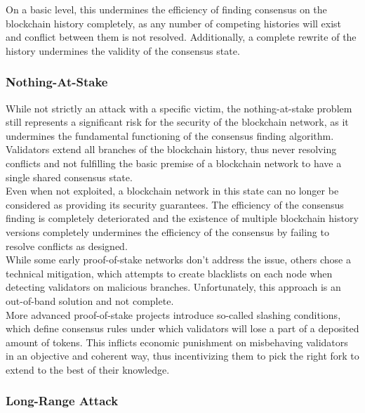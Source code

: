\documentclass[12pt,a4paper]{article}
\begin{document}
On a basic level, this undermines the efficiency of finding consensus on the blockchain history completely, as any number of competing histories will exist and conflict between them is not resolved. Additionally, a complete rewrite of the history undermines the validity of the consensus state.\\

\subsubsection{Nothing-At-Stake}

While not strictly an attack with a specific victim, the nothing-at-stake problem still represents a significant risk for the security of the blockchain network, as it undermines the fundamental functioning of the consensus finding algorithm. Validators extend all branches of the blockchain history, thus never resolving conflicts and not fulfilling the basic premise of a blockchain network to have a single shared consensus state.\\

Even when not exploited, a blockchain network in this state can no longer be considered as providing its security guarantees. The efficiency of the consensus finding is completely deteriorated and the existence of multiple blockchain history versions completely undermines the efficiency of the consensus by failing to resolve conflicts as designed.\\

While some early proof-of-stake networks don't address the issue, others chose a technical mitigation, which attempts to create blacklists on each node when detecting validators on malicious branches. Unfortunately, this approach is an out-of-band solution and not complete.\\

More advanced proof-of-stake projects introduce so-called slashing conditions,  which define consensus rules under which validators will lose a part of a deposited amount of tokens. This inflicts economic punishment on misbehaving validators in an objective and coherent way, thus incentivizing them to pick the right fork to extend to the best of their knowledge.\\

\subsubsection{Long-Range Attack}
\end{document}
